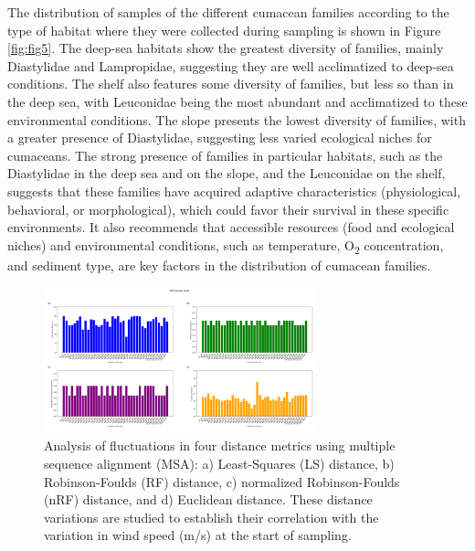 The distribution of samples of the different cumacean families according to the type of habitat where they were collected during sampling is shown in Figure \ref{fig:fig5}. The deep-sea habitats show the greatest diversity of families, mainly Diastylidae and Lampropidae, suggesting they are well acclimatized to deep-sea conditions. The shelf also features some diversity of families, but less so than in the deep sea, with Leuconidae being the most abundant and acclimatized to these environmental conditions. The slope presents the lowest diversity of families, with a greater presence of Diastylidae, suggesting less varied ecological niches for cumaceans. The strong presence of families in particular habitats, such as the Diastylidae in the deep sea and on the slope, and the Leuconidae on the shelf, suggests that these families have acquired adaptive characteristics (physiological, behavioral, or morphological), which could favor their survival in these specific environments. It also recommends that accessible resources (food and ecological niches) and environmental conditions, such as temperature, O\textsubscript{2} concentration, and sediment type, are key factors in the distribution of cumacean families.

\begin{figure}[]
    \centering
    \includegraphics[width=0.7\textwidth]{figure5.png}
     \caption{Analysis of fluctuations in four distance metrics using multiple sequence alignment (MSA): a) Least-Squares (LS) distance, b) Robinson-Foulds (RF) distance, c) normalized Robinson-Foulds (nRF) distance, and d) Euclidean distance. These distance variations are studied to establish their correlation with the variation in wind speed (m/s) at the start of sampling. \label{fig:fig6}}
\end{figure}

